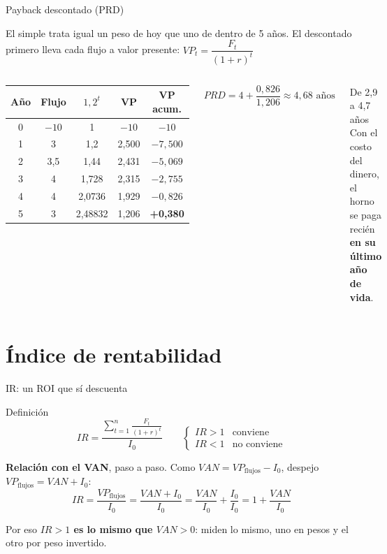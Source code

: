 \documentclass[aspectratio=169,10pt]{beamer}
\begin{document}
\begin{frame}{Payback descontado (PRD)}

El simple trata igual un peso de hoy que uno de dentro de 5 años. El descontado
primero lleva cada flujo a valor presente: $VP_t = \dfrac{F_t}{(1+r)^t}$

\begin{columns}[T]
\begin{center}
\small
\begin{tabular}{ccccc}
\toprule
Año & Flujo & $1{,}2^t$ & VP & VP acum. \\
\midrule
0 & $-10$ & 1       & $-10$    & $-10$ \\
1 & 3     & 1,2     & 2,500    & $-7{,}500$ \\
2 & 3,5   & 1,44    & 2,431    & $-5{,}069$ \\
3 & 4     & 1,728   & 2,315    & $-2{,}755$ \\
4 & 4     & 2,0736  & 1,929    & $-0{,}826$ \\
5 & 3     & 2,48832 & 1,206    & \textbf{+0,380} \\
\bottomrule
\end{tabular}
\end{center}

\[
PRD = 4 + \frac{0{,}826}{1{,}206} \approx 4{,}68 \text{ años}
\]

\begin{alertblock}{De 2,9 a 4,7 años}
Con el costo del dinero, el horno se paga recién \textbf{en su último año de vida}.
\end{alertblock}
\end{columns}
\end{frame}

\section{Índice de rentabilidad}

\begin{frame}{IR: un ROI que sí descuenta}

\begin{block}{Definición}
\[
IR = \frac{\displaystyle\sum_{t=1}^{n} \frac{F_t}{(1+r)^t}}{I_0}
\qquad
\begin{cases}
IR > 1 & \text{conviene} \\
IR < 1 & \text{no conviene}
\end{cases}
\]
\end{block}

\textbf{Relación con el VAN}, paso a paso. Como $VAN = VP_{\text{flujos}} - I_0$, despejo $VP_{\text{flujos}} = VAN + I_0$:
\[
IR = \frac{VP_{\text{flujos}}}{I_0} = \frac{VAN + I_0}{I_0} = \frac{VAN}{I_0} + \frac{I_0}{I_0} = 1 + \frac{VAN}{I_0}
\]

\begin{center}
Por eso \textbf{$IR > 1$ es lo mismo que $VAN > 0$}: miden lo mismo, uno en pesos y el otro por peso invertido.
\end{center}
\end{frame}
\end{document}
